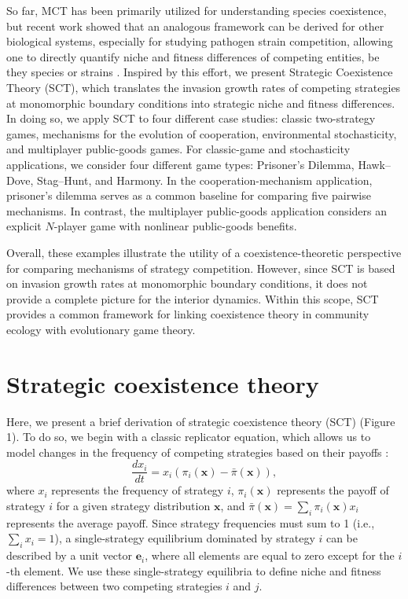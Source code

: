 \documentclass[12pt]{article}
\begin{document}
So far, MCT has been primarily utilized for understanding species coexistence, but recent work showed that an analogous framework can be derived for other biological systems, especially for studying pathogen strain competition, allowing one to directly quantify niche and fitness differences of competing entities, be they species or strains \citep{sieben2022quantifying,park2024predicting,park2026unifying}.
Inspired by this effort, we present Strategic Coexistence Theory (SCT), which translates the invasion growth rates of competing strategies at monomorphic boundary conditions into strategic niche and fitness differences.
In doing so, we apply SCT to four different case studies: classic two-strategy games, mechanisms for the evolution of cooperation, environmental stochasticity, and multiplayer public-goods games.
For classic-game and stochasticity applications, we consider four different game types: Prisoner’s Dilemma, Hawk–Dove, Stag–Hunt, and Harmony.
In the cooperation-mechanism application, prisoner's dilemma serves as a common baseline for comparing five pairwise mechanisms.
In contrast, the multiplayer public-goods application considers an explicit $N$-player game with nonlinear public-goods benefits.

Overall, these examples illustrate the utility of a coexistence-theoretic perspective for comparing mechanisms of strategy competition.
However, since SCT is based on invasion growth rates at monomorphic boundary conditions, it does not provide a complete picture for the interior dynamics.
Within this scope, SCT provides a common framework for linking coexistence theory in community ecology with evolutionary game theory.

\section*{Strategic coexistence theory}

Here, we present a brief derivation of strategic coexistence theory (SCT) (Figure 1).
To do so, we begin with a classic replicator equation, which allows us to model changes in the frequency of competing strategies based on their payoffs \citep{schuster1983replicator,hofbauer1998evolutionary,cressman2003evolutionary,cressman2014replicator}:
\begin{equation}
\frac{dx_i}{dt} = x_i (\pi_i(\mathbf{x}) - \bar{\pi}(\mathbf{x})),
\end{equation}
where $x_i$ represents the frequency of strategy $i$, $\pi_i(\mathbf{x})$ represents the payoff of strategy $i$ for a given strategy distribution $\mathbf{x}$, and $\bar{\pi}(\mathbf{x}) = \sum_i \pi_i(\mathbf{x}) x_i$ represents the average payoff. Since strategy frequencies must sum to 1 (i.e., $\sum_i x_i = 1$), a single-strategy equilibrium dominated by strategy $i$ can be described by a unit vector $\mathbf{e}_i$, where all elements are equal to zero except for the $i$-th element. 
We use these single-strategy equilibria to define niche and fitness differences between two competing strategies $i$ and $j$.
\end{document}
